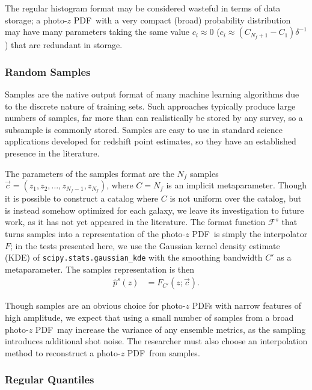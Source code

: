 \documentclass[\docopts]{\docclass}
\newcommand{\pz}{photo-$z$ PDF}
\begin{document}
The regular histogram format may be considered wasteful in terms of data 
storage; a \pz\ with a very compact (broad) probability distribution may have 
many parameters taking the same value $c_{i}\approx0$ 
($c_{i}\approx(C_{N_{f}+1}-C_{1})\delta^{-1}$) that are redundant in storage.

\subsubsection{Random Samples}
\label{sec:samples}

Samples are the native output format of many machine learning algorithms due to 
the discrete nature of training sets.  \citep{de_vicente_dnf_2016}
Such approaches typically produce large numbers of samples, far more than can 
realistically be stored by any survey, so a subsample is commonly stored.
Samples are easy to use in standard science applications developed for redshift 
point estimates, so they have an established presence in the literature.

The parameters of the samples format are the $N_{f}$ samples $\vec{c}=(z_{1}, 
z_{2}, \dots, z_{N_{f}-1}, z_{N_{f}})$, where $C=N_{f}$ is an implicit 
metaparameter.
Though it is possible to construct a catalog where $C$ is not uniform over the 
catalog, but is instead somehow optimized for each galaxy, we leave its 
investigation to future work, as it has not yet appeared in the literature.
The format function $\mathcal{F}^{s}$ that turns samples into a representation 
of the \pz\ is simply the interpolator $F$; in the tests presented here, we use 
the Gaussian kernel density estimate (KDE) of 
\texttt{scipy.stats.gaussian\_kde} with the smoothing bandwidth $C'$ as a 
metaparameter.  The samples representation is then
\begin{align}
  \label{eq:sampled}
  \hat{p}^{s}(z) &= F_{C'}(z; \vec{c}).
\end{align}

Though samples are an obvious choice for \pz s with narrow features of high 
amplitude, we expect that using a small number of samples from a broad \pz\ may 
increase the variance of any ensemble metrics, as the sampling introduces 
additional shot noise.
The researcher must also choose an interpolation method to reconstruct a \pz\ 
from samples.

\subsubsection{Regular Quantiles}
\label{sec:quantiles}
\end{document}
